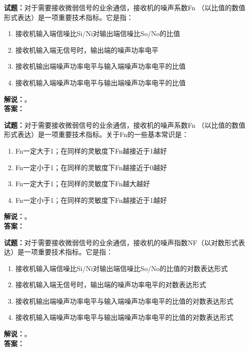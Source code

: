 \documentclass{ctexbook}
\begin{document}
\bigskip

\noindent\textbf{试题：}对于需要接收微弱信号的业余通信，接收机的噪声系数Fn （以比值的数值形式表达）是一项重要技术指标。它是指：
\begin{enumerate}[leftmargin=3em]
  \item 接收机输入端信噪比Si/Ni对输出端信噪比So/No的比值
  \item 接收机输入端无信号时，输出端的噪声功率电平
  \item 接收机输出端噪声功率电平与输入端噪声功率电平的比值
  \item 接收机输入端噪声功率电平与输出端噪声功率电平的比值
\end{enumerate}
\noindent\textbf{解说：}\textbf{}。\\\noindent\textbf{答案：}

\bigskip

\noindent\textbf{试题：}对于需要接收微弱信号的业余通信，接收机的噪声系数Fn （以比值的数值形式表达）是一项重要技术指标。关于Fn的一些基本常识是：
\begin{enumerate}[leftmargin=3em]
  \item Fn一定大于1；在同样的灵敏度下Fn越接近于1越好
  \item Fn一定小于1；在同样的灵敏度下Fn越接近于0越好
  \item Fn一定大于1；在同样的灵敏度下Fn越大越好
  \item Fn一定小于1；在同样的灵敏度下Fn越接近于1越好
\end{enumerate}
\noindent\textbf{解说：}\textbf{}。\\\noindent\textbf{答案：}

\bigskip

\noindent\textbf{试题：}对于需要接收微弱信号的业余通信，接收机的噪声指数NF（以对数形式表达）是一项重要技术指标。它是指：
\begin{enumerate}[leftmargin=3em]
  \item 接收机输入端信噪比Si/Ni对输出端信噪比So/No的比值的对数表达形式
  \item 接收机输入端无信号时，输出端的噪声功率电平的对数表达形式
  \item 接收机输出端噪声功率电平与输入端噪声功率电平的比值的对数表达形式
  \item 接收机输入端噪声功率电平与输出端噪声功率电平的比值的对数表达形式
\end{enumerate}
\noindent\textbf{解说：}\textbf{}。\\\noindent\textbf{答案：}

\bigskip
\end{document}
